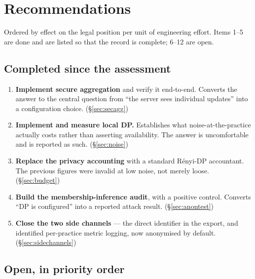 \section{Recommendations}
\label{sec:recs}

Ordered by effect on the legal position per unit of engineering effort. Items 1--5 are done and are
listed so that the record is complete; 6--12 are open.

\subsection*{Completed since the assessment}

\begin{enumerate}
  \item \textbf{Implement secure aggregation} and verify it end-to-end. Converts the answer to the
        central question from ``the server sees individual updates'' into a configuration choice.
        (\S\ref{sec:secagg})
  \item \textbf{Implement and measure local DP.} Establishes what noise-at-the-practice actually
        costs rather than asserting availability. The answer is uncomfortable and is reported as
        such. (\S\ref{sec:noise})
  \item \textbf{Replace the privacy accounting} with a standard R\'enyi-DP accountant. The previous
        figures were invalid at low noise, not merely loose. (\S\ref{sec:budget})
  \item \textbf{Build the membership-inference audit}, with a positive control. Converts ``DP is
        configured'' into a reported attack result. (\S\ref{sec:anontest})
  \item \textbf{Close the two side channels} --- the direct identifier in the export, and identified
        per-practice metric logging, now anonymised by default. (\S\ref{sec:sidechannels})
\end{enumerate}

\subsection*{Open, in priority order}

